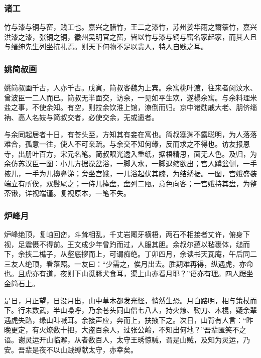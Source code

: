 \documentclass[]{article}
\begin{document}
\hypertarget{header-n363}{%
\subsubsection{诸工}\label{header-n363}}

竹与漆与铜与窑，贱工也。嘉兴之腊竹，王二之漆竹，苏州姜华雨之籋箓竹，嘉兴洪漆之漆，张铜之铜，徽州吴明官之窑，皆以竹与漆与铜与窑名家起家，而其人且与缙绅先生列坐抗礼焉。则天下何物不足以贵人，特人自贱之耳。

\hypertarget{header-n368}{%
\subsubsection{姚简叔画}\label{header-n368}}

姚简叔画千古，人亦千古。戊寅，简叔客魏为上宾。余寓桃叶渡，往来者闵汶水、曾波臣一二人而已。简叔无半面交，访余，一见如平生欢，遂榻余寓。与余料理米盐之事，不使余知。有空，则拉余饮淮上馆，潦倒而归。京中诸勋戚大老、朋侪缁衲、高人名妓与简叔交者，必使交余，无或遗者。

与余同起居者十日，有苍头至，方知其有妾在寓也。简叔塞渊不露聪明，为人落落难合，孤意一往，使人不可亲疏。与余交不知何缘，反而求之不得也。访友报恩寺，出册叶百方，宋元名笔。简叔眼光透入重纸，据梧精思，面无人色。及归，为余仿苏汉臣一图：小儿方据澡盆浴，一脚入水，一脚退缩欲出；宫人蹲盆侧，一手掖儿，一手为儿擤鼻涕；旁坐宫娥，一儿浴起伏其膝，为结绣裾。一图，宫娥盛装端立有所俟，双鬟尾之；一侍儿捧盘，盘列二瓯，意色向客；一宫娥持其盘，为整茶锹，详视端谨。复视原本，一笔不失。

\hypertarget{header-n373}{%
\subsubsection{炉峰月}\label{header-n373}}

炉峰绝顶，复岫回峦，斗耸相乱，千丈岩陬牙横梧，两石不相接者丈许，俯身下视，足震慑不得前。王文成少年曾趵而过，人服其胆。余叔尔蕴以毡裹体，缒而下，余挟二樵子，从壑底摉而上，可谓痴绝。丁卯四月，余读书天瓦庵，午后同二三友人绝顶，看落照。一友曰：``少需之，俟月出去。胜期难再得，纵遇虎，亦命也。且虎亦有道，夜则下山觅豚犬食耳，渠上山亦看月耶？''语亦有理。四人踞坐金简石上。

是日，月正望，日没月出，山中草木都发光怪，悄然生恐。月白路明，相与策杖而下。行未数武，半山嘄呼，乃余苍头同山僧七八人，持火燎、靿刀、木棍，疑余辈遇虎失路，缘山叫喊耳。余接声应，奔而上，扶掖下之。次日，山背有人言：``昨晚更定，有火燎数十把，大盗百余人，过张公岭，不知出何地？''吾辈匿笑不之语。谢灵运开山临澥，从者数百人，太守王琇惊駴，谓是山贼，及知为灵运，乃安。吾辈是夜不以山贼缚献太守，亦幸矣。
\end{document}
